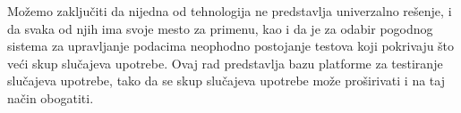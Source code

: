 \documentclass[12pt,oneside]{memoir}
\begin{document}
Možemo zaključiti da nijedna od tehnologija ne predstavlja univerzalno rešenje, i da svaka od njih ima svoje mesto za primenu, kao i da je za odabir pogodnog sistema za upravljanje podacima neophodno postojanje testova koji pokrivaju što veći skup slučajeva upotrebe. Ovaj rad predstavlja bazu platforme za testiranje slučajeva upotrebe, tako da se skup slučajeva upotrebe može proširivati i na taj način obogatiti.



\literatura

\backmatter

\end{document}
